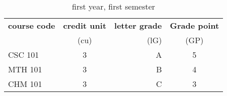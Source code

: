 \documentclass{article}
\begin{document}
	\begin{table}[h!]
	\begin{center}
	\caption{first year, first semester}
	\label{tab:table1}
	\begin{tabular}{l|c|r|c}
	\textbf{course code} & \textbf{credit unit} & \textbf{letter grade} &\textbf{Grade point}\\
	&(cu) &(lG) & (GP)\\
	\hline
	CSC 101 & 3 & A & 5\\
	MTH 101 & 3 & B & 4\\
	CHM 101 & 3 & C & 3\\
	\end{tabular}
\end{center}
\end{table}
\end{document}
